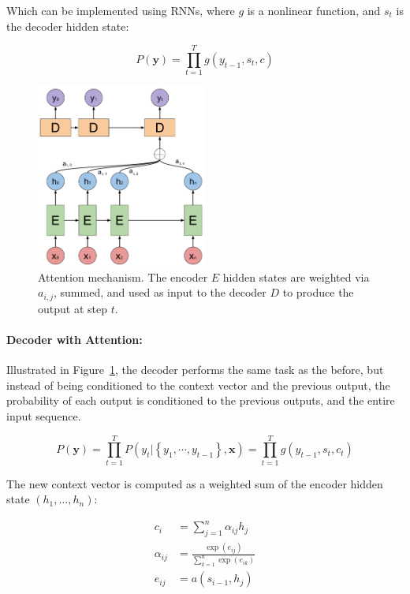Which can be implemented using RNNs, where $g$ is a nonlinear function, and $s_t$ is the decoder hidden state:

\begin{equation}
P(\mathbf{y})=\prod_{t=1}^{T} g\left(y_{t-1}, s_{t}, c\right)
\end{equation}


\begin{figure}[t]
        \centering
        \includegraphics[width=0.5\textwidth]{images/Attention.pdf}
        \caption{Attention mechanism. The encoder $E$ hidden states are weighted via $a_{i, j}$, summed, and used as input to the decoder $D$ to produce the output at step $t$.}
        \label{fig:attention}
\end{figure}%

\paragraph{Decoder with Attention:} Illustrated in Figure~\ref{fig:attention}, the \cite{bahdanau2014neural} decoder performs the same task as the before, but instead of being conditioned to the context vector and the previous output, the probability of each output is conditioned to the previous outputs, and the entire input sequence.



\begin{equation}
P(\mathbf{y})=\prod_{t=1}^{T} P\left(y_{t} |\left\{y_{1}, \cdots, y_{t-1}\right\}, \textbf{x}\right) = \prod_{t=1}^{T} g\left(y_{t-1}, s_{t}, c_t\right)
\end{equation}

The new context vector is computed as a weighted sum of the encoder hidden state $(h_1, \dots, h_n)$: 

\begin{equation}
\begin{split}
    c_{i} & = \sum_{j=1}^{n} \alpha_{i j} h_{j}\\
    \alpha_{i j} &= \frac{\exp \left(e_{i j}\right)}{\sum_{k=1}^{n} \exp \left(e_{i k}\right)} \\
    e_{i j} &= a\left(s_{i-1}, h_{j}\right)
\end{split}
\end{equation}

